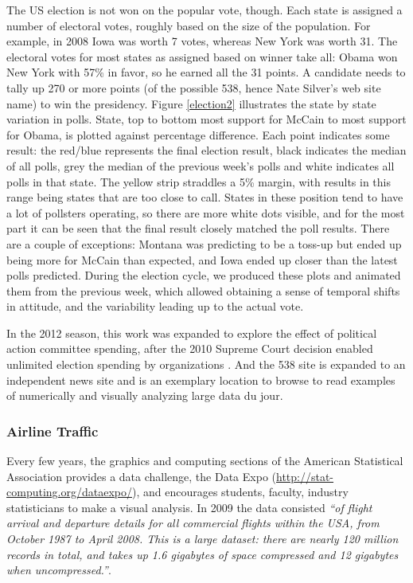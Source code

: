 \documentclass{article}
\begin{document}
The US election is not won on the popular vote, though. Each state is assigned a number of electoral votes, roughly based on the size of the population. For example, in 2008 Iowa was worth 7 votes, whereas New York was worth 31. The electoral votes for most states as assigned based on winner take all: Obama won New York with 57\% in favor, so he earned all the 31 points. A candidate needs to tally up 270 or more points (of the possible 538, hence Nate Silver's web site name) to win the presidency. Figure \ref{election2} illustrates the state by state variation in polls. State, top to bottom most support for McCain to most support for Obama, is plotted against percentage difference. Each point indicates some result: the red/blue represents the final election result, black indicates the median of all polls, grey the median of the previous week's polls and white indicates all polls in that state. The yellow strip straddles a 5\% margin, with results in this range being states that are too close to call. States in these position tend to have a lot of pollsters operating, so there are more white dots visible, and for the most part it can be seen that the final result closely matched the poll results. There are a couple of exceptions: Montana was predicting to be a toss-up but ended up being more for McCain than expected, and Iowa ended up closer than the latest polls predicted. During the election cycle, we produced these plots and animated them from the previous week, which allowed obtaining a sense of temporal shifts in attitude, and the variability leading up to the actual vote.

In the 2012 season, this work was expanded to explore the effect of political action committee spending, after the 2010 Supreme Court decision enabled unlimited election spending by organizations \citep{kaplan2012}. And the 538 site is expanded to an independent news site and is an exemplary location to browse to read examples of numerically and visually analyzing large data du jour.

\subsubsection{Airline Traffic}

Every few years, the graphics and computing sections of the American Statistical Association provides a data challenge, the Data Expo (\url{http://stat-computing.org/dataexpo/}), and encourages students, faculty, industry statisticians to make a visual analysis. In 2009 the data consisted {\em ``of flight arrival and departure details for all commercial flights within the USA, from October 1987 to April 2008. This is a large dataset: there are nearly 120 million records in total, and takes up 1.6 gigabytes of space compressed and 12 gigabytes when uncompressed.''}.
\end{document}
